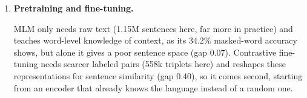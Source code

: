 \documentclass[12pt]{article}
\theoremstyle{definition}
\begin{document}
{\begin{enumerate}[label=\textbf{2.3.\arabic*}, leftmargin=*]
    The contrastive loss optimizes the cosine itself against in-batch
    negatives, while classification only needs $[u;v;|u-v|]$ to be separable
    by its linear head, so its cosines stay high for every pair (0.59 for
    dissimilar pairs vs.\ 0.41) and its gap is smaller (0.29 vs.\ 0.40). The
    searches show the same thing: for the stock-market query, the
    classification model returns unrelated sentences (bitcoins, a prison) at
    0.86, while the contrastive model returns three stock-market sentences,
    and it is also the only one to find sleeping cats for the first query.

    \item \textbf{Pretraining and fine-tuning.}\par
    MLM only needs raw text (1.15M sentences here, far more in practice) and
    teaches word-level knowledge of context, as its 34.2\% masked-word
    accuracy shows, but alone it gives a poor sentence space (gap 0.07).
    Contrastive fine-tuning needs scarcer labeled pairs (558k triplets here)
    and reshapes these representations for sentence similarity (gap 0.40), so
    it comes second, starting from an encoder that already knows the language
    instead of a random one.
\end{enumerate}
}
\end{document}
